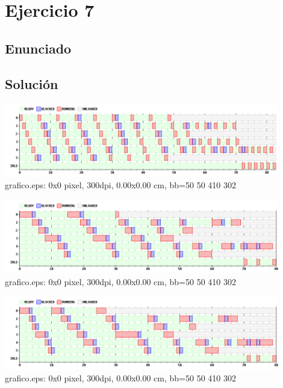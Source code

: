 \section{Ejercicio 7}
\subsection{Enunciado}

\subsection{Soluci\'on}


\begin {center}
\includegraphics[width=12cm]{../simusched/outputs/ej7/rr-ej7-0-1.png}
grafico.eps: 0x0 pixel, 300dpi, 0.00x0.00 cm, bb=50 50 410 302
\end {center}

\begin {center}
\includegraphics[width=12cm]{../simusched/outputs/ej7/rr-ej7-0-5.png}
grafico.eps: 0x0 pixel, 300dpi, 0.00x0.00 cm, bb=50 50 410 302
\end {center}

\begin {center}
\includegraphics[width=12cm]{../simusched/outputs/ej7/rr-ej7-0-20.png}
grafico.eps: 0x0 pixel, 300dpi, 0.00x0.00 cm, bb=50 50 410 302
\end {center}


